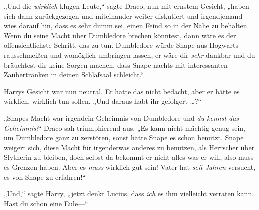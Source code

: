 „Und die \emph{wirklich} klugen Leute,“ sagte Draco, nun mit ernstem Gesicht, „haben sich dann zurückgezogen und miteinander weiter diskutiert und irgendjemand wies darauf hin, dass es sehr dumm sei, einen Feind so in der Nähe zu behalten. Wenn du seine Macht über Dumbledore brechen könntest, dann wäre es der offensichtlichste Schritt, das zu tun. Dumbledore würde Snape aus Hogwarts rausschmeißen und womöglich umbringen lassen, er wäre dir \emph{sehr} dankbar und du bräuchtest dir keine Sorgen machen, dass Snape nachts mit interessanten Zaubertränken in deinen Schlafsaal schleicht.“

Harrys Gesicht war nun neutral. Er hatte das nicht bedacht, aber er hätte es wirklich, wirklich tun sollen. „Und daraus habt ihr gefolgert …?“

„Snapes Macht war irgendein Geheimnis von Dumbledore und \emph{du kennst das Geheimnis!}“ Draco sah triumphierend aus. „Es kann nicht mächtig genug sein, um Dumbledore ganz zu zerstören, sonst hätte Snape es schon benutzt. Snape weigert sich, diese Macht für irgendetwas anderes zu benutzen, als Herrscher über Slytherin zu bleiben, doch selbst da bekommt er nicht alles was er will, also muss es Grenzen haben. Aber es \emph{muss} wirklich gut sein! Vater hat \emph{seit Jahren} versucht, es von Snape zu erfahren!“

„Und,“ sagte Harry, „jetzt denkt Lucius, dass \emph{ich} es ihm vielleicht verraten kann. Hast du schon eine Eule—“


